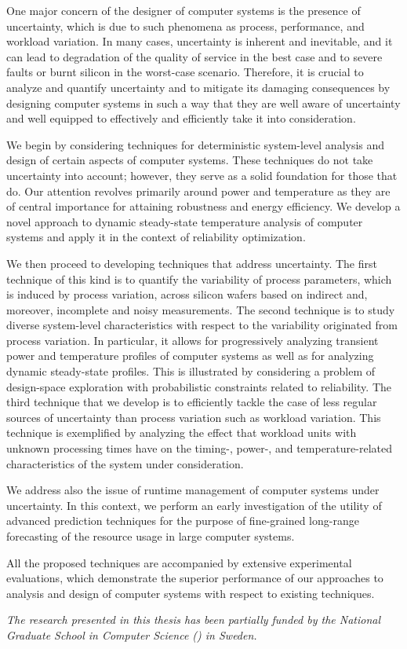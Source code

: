 One major concern of the designer of computer systems is the presence of
uncertainty, which is due to such phenomena as process, performance, and
workload variation. In many cases, uncertainty is inherent and inevitable, and
it can lead to degradation of the quality of service in the best case and to
severe faults or burnt silicon in the worst-case scenario. Therefore, it is
crucial to analyze and quantify uncertainty and to mitigate its damaging
consequences by designing computer systems in such a way that they are well
aware of uncertainty and well equipped to effectively and efficiently take it
into consideration.

We begin by considering techniques for deterministic system-level analysis and
design of certain aspects of computer systems. These techniques do not take
uncertainty into account; however, they serve as a solid foundation for those
that do. Our attention revolves primarily around power and temperature as they
are of central importance for attaining robustness and energy efficiency. We
develop a novel approach to dynamic steady-state temperature analysis of
computer systems and apply it in the context of reliability optimization.

We then proceed to developing techniques that address uncertainty. The first
technique of this kind is to quantify the variability of process parameters,
which is induced by process variation, across silicon wafers based on indirect
and, moreover, incomplete and noisy measurements. The second technique is to
study diverse system-level characteristics with respect to the variability
originated from process variation. In particular, it allows for progressively
analyzing transient power and temperature profiles of computer systems as well
as for analyzing dynamic steady-state profiles. This is illustrated by
considering a problem of design-space exploration with probabilistic constraints
related to reliability. The third technique that we develop is to efficiently
tackle the case of less regular sources of uncertainty than process variation
such as workload variation. This technique is exemplified by analyzing the
effect that workload units with unknown processing times have on the timing-,
power-, and temperature-related characteristics of the system under
consideration.

We address also the issue of runtime management of computer systems under
uncertainty. In this context, we perform an early investigation of the utility
of advanced prediction techniques for the purpose of fine-grained long-range
forecasting of the resource usage in large computer systems.

All the proposed techniques are accompanied by extensive experimental
evaluations, which demonstrate the superior performance of our approaches to
analysis and design of computer systems with respect to existing techniques.

\vspace{1em}
\noindent
\emph{The research presented in this thesis has been partially funded by the
National Graduate School in Computer Science () in Sweden.}
